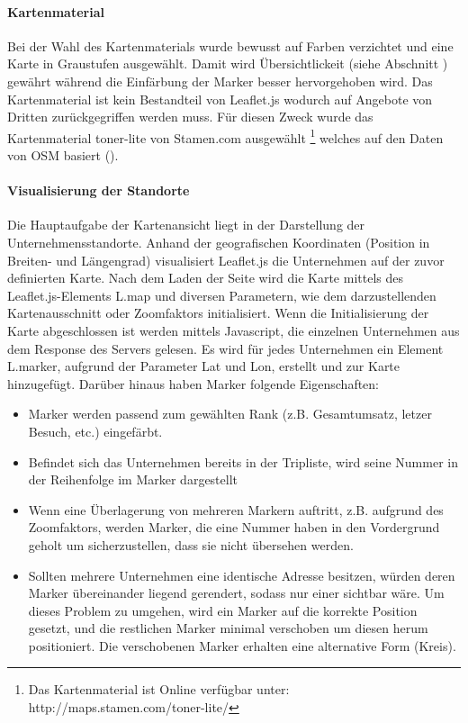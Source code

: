 \documentclass[Bachelorarbeit.tex]{subfiles}
\begin{document}
\paragraph{Kartenmaterial}
Bei der Wahl des Kartenmaterials wurde bewusst auf Farben verzichtet und eine Karte in Graustufen ausgewählt. 
Damit wird Übersichtlickeit (siehe Abschnitt ) gewährt während die Einfärbung der Marker besser hervorgehoben wird.
Das Kartenmaterial ist kein Bestandteil von Leaflet.js wodurch auf Angebote von Dritten zurückgegriffen werden muss.
Für diesen Zweck wurde das Kartenmaterial toner-lite von Stamen.com ausgewählt
\footnote{Das Kartenmaterial ist Online verfügbar unter: http://maps.stamen.com/toner-lite/}  
welches auf den Daten von \ac{OSM} basiert (\cite[vgl.][]{Stamen}). 


\paragraph{Visualisierung der Standorte}
\label{ImplVisualStandorte}
Die Hauptaufgabe der Kartenansicht liegt in der Darstellung der Unternehmensstandorte.
Anhand der geografischen Koordinaten (Position in Breiten- und Längengrad) visualisiert Leaflet.js die Unternehmen auf der zuvor definierten Karte. 
Nach dem Laden der Seite wird die Karte mittels des Leaflet.js-Elements L.map und diversen Parametern, wie dem darzustellenden Kartenausschnitt oder Zoomfaktors initialisiert.
Wenn die Initialisierung der Karte abgeschlossen ist werden mittels Javascript, die einzelnen Unternehmen aus dem Response des Servers gelesen. 
Es wird für jedes Unternehmen ein Element L.marker, aufgrund der Parameter Lat und Lon, erstellt und zur Karte hinzugefügt.
\newpage
Darüber hinaus haben Marker folgende Eigenschaften:
\begin{itemize}
	\item Marker werden passend zum gewählten Rank (z.B. Gesamtumsatz, letzer Besuch, etc.) eingefärbt.
	\item Befindet sich das Unternehmen bereits in der Tripliste, wird seine Nummer in der Reihenfolge im Marker dargestellt
	\item Wenn eine Überlagerung von mehreren Markern auftritt, z.B. aufgrund des Zoomfaktors, werden Marker, die eine Nummer haben in den Vordergrund geholt um sicherzustellen, dass sie nicht übersehen werden.
	\item Sollten mehrere Unternehmen eine identische Adresse besitzen, würden deren Marker übereinander liegend gerendert, sodass nur einer sichtbar wäre. 
	Um dieses Problem zu umgehen, wird ein Marker auf die korrekte Position gesetzt, und die restlichen Marker minimal verschoben um diesen herum positioniert.
	Die verschobenen Marker erhalten eine alternative Form (Kreis).
\end{itemize}
\end{document}
